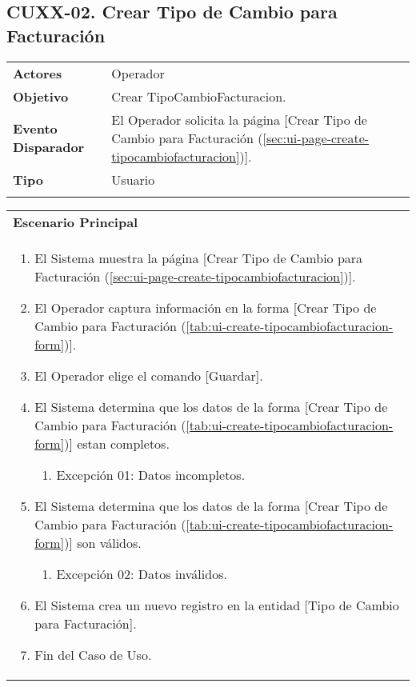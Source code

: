 \clearpage
\subsection{CUXX-02. Crear Tipo de Cambio para Facturación} \label{sec:cu-create-TipoCambioFacturacion}

\begin{tabular}{ p{3.5cm} p{11.5cm} }
	\textbf{Actores} & Operador\\
	\textbf{Objetivo} & Crear TipoCambioFacturacion.\\
	\textbf{Evento Disparador} & El Operador solicita la página [Crear Tipo de Cambio para Facturación (\ref{sec:ui-page-create-tipocambiofacturacion})].\\
	\textbf{Tipo} & Usuario\\
	\\
\end{tabular}

\begin{tabular}{ p{15.5cm} }
	\textbf{Escenario Principal} \\
	\begin{enumerate}
		\item El Sistema muestra la página [Crear Tipo de Cambio para Facturación (\ref{sec:ui-page-create-tipocambiofacturacion})].
		\item El Operador captura información en la forma [Crear Tipo de Cambio para Facturación (\ref{tab:ui-create-tipocambiofacturacion-form})].
		\item El Operador elige el comando [Guardar].
		\item El Sistema determina que los datos de la forma [Crear Tipo de Cambio para Facturación (\ref{tab:ui-create-tipocambiofacturacion-form})] estan completos.
			\begin{enumerate}
				\item Excepción 01: Datos incompletos.
			\end{enumerate}
		\item El Sistema determina que los datos de la forma [Crear Tipo de Cambio para Facturación (\ref{tab:ui-create-tipocambiofacturacion-form})] son válidos.
			\begin{enumerate}
				\item Excepción 02: Datos inválidos.
			\end{enumerate}
		\item El Sistema crea un nuevo registro en la entidad [Tipo de Cambio para Facturación].
		\item Fin del Caso de Uso.
	\end{enumerate}
\end{tabular}


